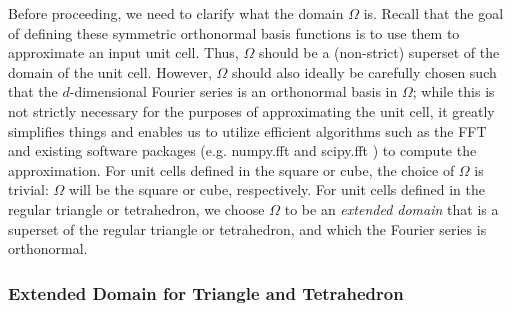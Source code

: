 \documentclass[acmtog]{acmart}
\begin{document}
Before proceeding, we need to clarify what the domain $\Omega$ is. Recall that the goal of defining these symmetric orthonormal basis functions is to use them to approximate an input unit cell. Thus, $\Omega$ should be a (non-strict) superset of the domain of the unit cell. However, $\Omega$ should also ideally be carefully chosen such that the $d$-dimensional Fourier series is an orthonormal basis in $\Omega$; while this is not strictly necessary for the purposes of approximating the unit cell, it greatly simplifies things and enables us to utilize efficient algorithms such as the FFT and existing software packages (e.g. numpy.fft \cite{harris2020array} and scipy.fft \cite{virtanen2020scipy}) to compute the approximation. For unit cells defined in the square or cube, the choice of $\Omega$ is trivial: $\Omega$ will be the square or cube, respectively. For unit cells defined in the regular triangle or tetrahedron, we choose $\Omega$ to be an \textit{extended domain} that is a superset of the regular triangle or tetrahedron, and which the Fourier series is orthonormal.

\subsubsection{Extended Domain for Triangle and Tetrahedron}
\end{document}
